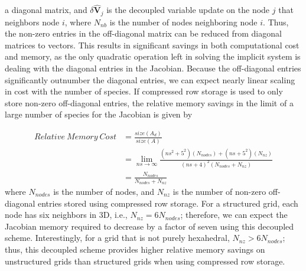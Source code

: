 a diagonal matrix, and $\delta \mathbf{\hat{V}}_j$  is the decoupled variable
update on the node $j$ that neighbors node $i$, where $N_{nb}$ is the number of
nodes neighboring node $i$.  Thus, the non-zero entries in the off-diagonal
matrix can be reduced from diagonal matrices to vectors.  This results in
significant savings in both computational cost and memory, as the only quadratic
operation left in solving the implicit system is dealing with the diagonal
entries in the Jacobian.  Because the off-diagonal entries significantly
outnumber the diagonal entries, we can expect nearly linear scaling in cost with
the number of species.  If compressed row storage\cite{George} is used to
only store non-zero off-diagonal entries, the relative memory savings in the
limit of a large number of species for the Jacobian is given by
%

\begin{equation} \label{mem_req_eq} \begin{split} Relative\ Memory\ Cost &=
    \frac{size(A_d)}{size(A)} \\ &= \lim_{ns\to\infty}
    \frac{(ns^2+5^2)(N_{nodes})+(ns+5^2)(N_{nz})}{(ns+4)^2(N_{nodes}+N_{nz})} \\
    &= \frac{N_{nodes}}{N_{nodes} + N_{nz}} \end{split} \end{equation}
%
where $N_{nodes}$ is the number of nodes, and $N_{nz}$ is the number of non-zero
off-diagonal entries stored using compressed row storage. For a structured grid,
each node has six neighbors in 3D, i.e., $N_{nz} = 6N_{nodes}$; therefore, we can
expect the Jacobian memory required to decrease by a factor of seven using this
decoupled scheme. Interestingly, for a grid that is not purely hexahedral,
$N_{nz} > 6N_{nodes}$; thus, this decoupled scheme provides higher relative
memory savings on unstructured grids than structured grids when using compressed
row storage.


